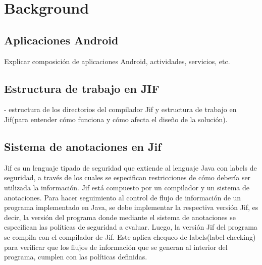 \section{Background}
\label{sec:back}

\subsection{Aplicaciones Android}
Explicar composición de aplicaciones Android, actividades, servicios, etc.

\subsection{Estructura de trabajo en JIF}
- estructura de los directorios del compilador Jif y estructura de trabajo en
Jif(para entender cómo funciona y cómo afecta el diseño de la
solución).

\subsection{Sistema de anotaciones en Jif}
Jif es un lenguaje tipado de seguridad que extiende al lenguaje Java con labels
de seguridad, a través de los cuales se especifican restricciones de cómo
debería ser utilizada la información.\newline 
Jif está compuesto por un compilador y un sistema de anotaciones.\newline
Para hacer seguimiento al control de flujo de información de un programa
implementado en Java, se debe implementar la respectiva versión Jif, es decir,
la versión del programa donde mediante el sistema de anotaciones se especifican
las políticas de seguridad a evaluar.\newline 
Luego, la versión Jif del programa se compila con el compilador de Jif.
Este aplica chequeo de labels(label checking)\cite{jifRef} para verificar que
los flujos de información que se generan al interior del programa, cumplen con
las políticas definidas.

